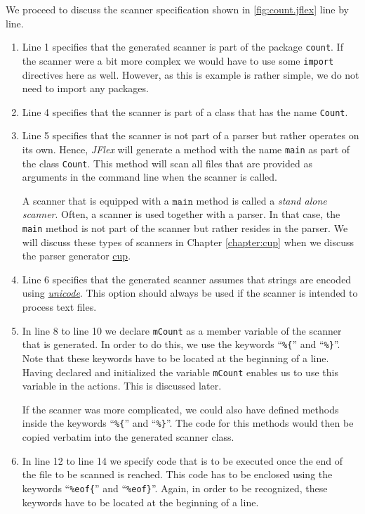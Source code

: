 We proceed to discuss the scanner specification shown in \ref{fig:count.jflex} line by line.
\begin{enumerate}
\item Line 1 specifies that the generated scanner is part of the package \texttt{count}.
      If the scanner were a bit more complex we would have to use some \texttt{import} directives
      here as well.  However, as this is example is rather simple, we do not need to import
      any packages.
\item Line 4 specifies that the scanner is part of a class that has the name \texttt{Count}.
\item Line 5 specifies that the scanner is not part of a parser but rather operates on its own.
      Hence,  \textsl{JFlex} will generate a method with the name \texttt{main} as part of the
      class \texttt{Count}.  This method will scan all files that are provided as arguments in the
      command line when the scanner is called.

      A scanner that is equipped with a  $\texttt{main}$ method is called a 
      \emph{stand alone scanner}.  Often, a scanner is used together with a parser.  In that case,
      the \texttt{main} method is not part of the scanner but rather resides in the parser.  We will
      discuss these types of scanners in Chapter \ref{chapter:cup} when we discuss the parser generator 
      \href{http://www2.cs.tum.edu/projects/cup/}{cup}.
\item Line 6 specifies that the generated scanner assumes that strings are encoded using
      \href{https://en.wikipedia.org/wiki/Unicode}{\emph{unicode}}.  This option should always be
      used if the scanner is intended  to process text files.
\item In line 8 to line 10 we declare \texttt{mCount} as a member variable of the scanner that is
      generated.  In order to do this, we use the keywords ``\texttt{\%\{}'' and ``\texttt{\%\}}''.
      Note that these keywords have to be located at the beginning of a line.  Having declared and
      initialized the variable \texttt{mCount} enables us to use this variable in the actions.  This
      is discussed later.

      If the scanner was more complicated, we could also have defined methods inside the keywords
      ``\texttt{\%\{}'' and ``\texttt{\%\}}''.  
      The code for this methods would then be copied verbatim into the generated scanner class.
\item In line 12 to line 14 we specify code that is to be executed once the end of the file to be
      scanned is reached.  This code has to be enclosed using the keywords
      ``\texttt{\%eof\{}'' and ``\texttt{\%eof\}}''.  
      Again, in order to be recognized, these keywords have to be located at the beginning of a line.


\end{enumerate}
